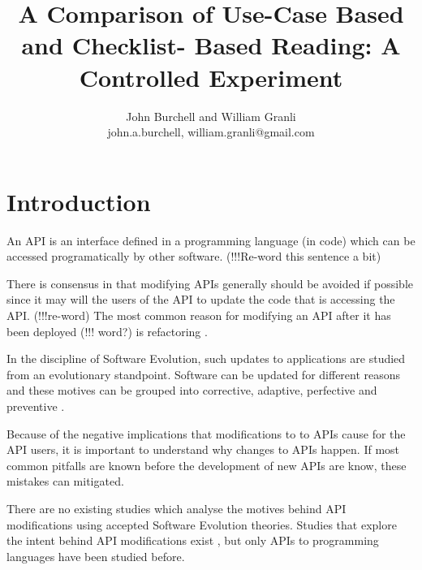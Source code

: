 \documentclass[10pt,twocolumn]{article}
\begin{document}
\title{A Comparison of Use-Case Based and Checklist-
Based Reading: A Controlled Experiment}

\author{John Burchell and William Granli \\
john.a.burchell, william.granli@gmail.com}


\maketitle
\thispagestyle{empty}


\section{Introduction}
An API is an interface defined in a programming language (in code) which can be accessed programatically by other software. (!!!Re-word this sentence a bit) %

There is consensus in that modifying APIs generally should be avoided if possible \cite{google_talk} \cite{mcdonnell2013empirical} \cite{robbes2012developers} \cite{henning2007api} \cite{robbes2012developers} since it may will the users of the API to update the code that is accessing the API. (!!!re-word) The most common reason for modifying an API after it has been deployed (!!! word?) is refactoring \cite{dig2005role} \cite{xing2006refactoring}. %


In the discipline of Software Evolution, such updates to applications are studied from an evolutionary standpoint. Software can be updated for different reasons and these motives can be grouped into corrective, adaptive, perfective and preventive \cite{lientz1980software}. %

Because of the negative implications that modifications to to APIs cause for the API users, it is important to understand why changes to APIs happen. If most common pitfalls are known before the development of new APIs are know, these mistakes can mitigated. 

There are no existing studies which analyse the motives behind API modifications using accepted Software Evolution theories. Studies that explore the intent behind API modifications exist \cite{hou2011exploring}, but only APIs to programming languages have been studied before.  %
\end{document}
